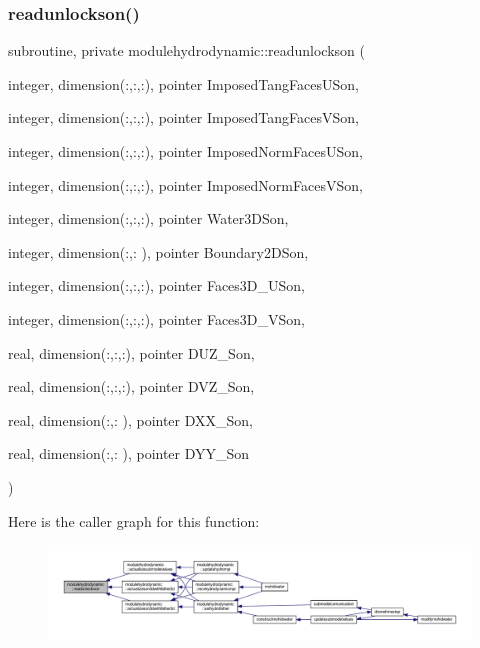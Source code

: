 \subsubsection{\texorpdfstring{readunlockson()}{readunlockson()}}
{\footnotesize\ttfamily subroutine, private modulehydrodynamic\+::readunlockson (\begin{DoxyParamCaption}\item[{integer, dimension(\+:,\+:,\+:), pointer}]{Imposed\+Tang\+Faces\+U\+Son,  }\item[{integer, dimension(\+:,\+:,\+:), pointer}]{Imposed\+Tang\+Faces\+V\+Son,  }\item[{integer, dimension(\+:,\+:,\+:), pointer}]{Imposed\+Norm\+Faces\+U\+Son,  }\item[{integer, dimension(\+:,\+:,\+:), pointer}]{Imposed\+Norm\+Faces\+V\+Son,  }\item[{integer, dimension(\+:,\+:,\+:), pointer}]{Water3\+D\+Son,  }\item[{integer, dimension(\+:,\+:  ), pointer}]{Boundary2\+D\+Son,  }\item[{integer, dimension(\+:,\+:,\+:), pointer}]{Faces3\+D\+\_\+\+U\+Son,  }\item[{integer, dimension(\+:,\+:,\+:), pointer}]{Faces3\+D\+\_\+\+V\+Son,  }\item[{real, dimension(\+:,\+:,\+:), pointer}]{D\+U\+Z\+\_\+\+Son,  }\item[{real, dimension(\+:,\+:,\+:), pointer}]{D\+V\+Z\+\_\+\+Son,  }\item[{real, dimension(\+:,\+:  ), pointer}]{D\+X\+X\+\_\+\+Son,  }\item[{real, dimension(\+:,\+:  ), pointer}]{D\+Y\+Y\+\_\+\+Son }\end{DoxyParamCaption})\hspace{0.3cm}{\ttfamily [private]}}

Here is the caller graph for this function\+:\nopagebreak
\begin{figure}[H]
\begin{center}
\leavevmode
\includegraphics[width=350pt]{namespacemodulehydrodynamic_a0f4e404d78ffa5a1fef104a6f662d68d_icgraph}
\end{center}
\end{figure}
\mbox{\label{namespacemodulehydrodynamic_a541821548a44af36e71f5eddedae890e}} 
